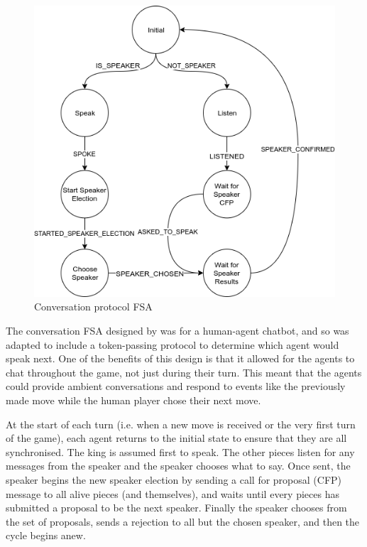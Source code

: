 \documentclass[conference]{IEEEtran}
\begin{document}
\begin{figure}[!h]
	\centering
	\includegraphics[width=\linewidth]{images/conversationfsa}
	\caption{Conversation protocol FSA}
	\label{fig:conversationfsa}
\end{figure}

The conversation FSA designed by \cite{tartan} was for a human-agent chatbot, and so was adapted to include a token-passing protocol to determine which agent would speak next. One of the benefits of this design is that it allowed for the agents to chat throughout the game, not just during their turn. This meant that the agents could provide ambient conversations and respond to events like the previously made move while the human player chose their next move.

At the start of each turn (i.e. when a new move is received or the very first turn of the game), each agent returns to the initial state to ensure that they are all synchronised. The king is assumed first to speak. The other pieces listen for any messages from the speaker and the speaker chooses what to say. Once sent, the speaker begins the new speaker election by sending a call for proposal (CFP) message to all alive pieces (and themselves), and waits until every pieces has submitted a proposal to be the next speaker. Finally the speaker chooses from the set of proposals, sends a rejection to all but the chosen speaker, and then the cycle begins anew.
\end{document}
